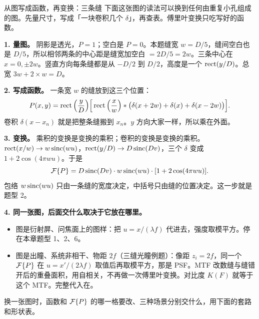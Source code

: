 \begin{exam}{从图写成函数，再变换：三条缝}
下面这张图的读法可以换到任何由重复小孔组成的图。先量尺寸，写成「一块卷积几个 $\delta$」，再查表。傅里叶变换只吃写好的函数。

\textbf{1. 量图。} 阴影是透光，$P=1$；空白是 $P=0$。本题缝宽 $w=D/5$，缝间空白也是 $D/5$，所以相邻两条的中心距是缝宽加空白 $=2D/5=2w$。三条中心在 $x=0,\pm2w$。竖直方向每条缝都是从 $-D/2$ 到 $D/2$，高度是一个 $\operatorname{rect}(y/D)$。总宽 $3w+2\times w=D$。

\textbf{2. 写成函数。} 一条宽 $w$ 的缝放到这三个位置：
\[
P(x,y)=\operatorname{rect}\Big(\frac yD\Big)\Big[\operatorname{rect}\Big(\frac xw\Big)\ast\big(\delta(x+2w)+\delta(x)+\delta(x-2w)\big)\Big].
\]
卷积 $\delta(x-x_n)$ 就是把整条缝搬到 $x_n$。$y$ 方向大家一样，所以乘在外面。

\textbf{3. 变换。} 乘积的变换是变换的乘积；卷积的变换是变换的乘积。$\operatorname{rect}(x/w)\to w\operatorname{sinc}(wu)$，$\operatorname{rect}(y/D)\to D\operatorname{sinc}(Dv)$，三个 $\delta$ 变成 $1+2\cos(4\pi wu)$。于是
\[
\mathcal{F}\{P\}=D\operatorname{sinc}(Dv)\cdot w\operatorname{sinc}(wu)\cdot[1+2\cos(4\pi wu)].
\]
包络 $w\operatorname{sinc}(wu)$ 只由一条缝的宽度决定，中括号只由缝的位置决定。这一步就是题型 2。

\textbf{4. 同一张图，后面交什么取决于它放在哪里。}
\begin{itemize}
\item 图是衍射屏、问焦面上的图样：把 $u=x/(\lambda f)$ 代进去，强度取模平方。停在本章题型 1、2、6。
\item 图是出瞳、系统非相干、物距 $2f$（三缝光瞳例题）：像距 $z_i=2f$，同一个 $\mathcal{F}\{P\}$ 在 $u=x'/(2\lambda f)$ 取值后再取模平方，那是 PSF。MTF 改数缝与缝错开后的重叠面积，用自相关，不再做一次傅里叶变换。对比度 $K(F)$ 就等于这个 MTF。完整代入在\pageref{ex:v-3slit}。
\end{itemize}

换一张图时，函数和 $\mathcal{F}\{P\}$ 的哪一格要改、三种场景分别交什么，用下面的套路和形状表。
\end{exam}

